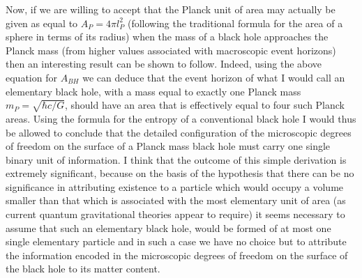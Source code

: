 \documentclass[notitlepage,12pt]{report}
\begin{document}
Now, if we are willing to accept that the Planck unit of area may actually be given as equal to $A_P=4\pi l_P^2$ (following the traditional formula for the area of a sphere in terms of its radius) when the mass of a black hole approaches the Planck mass (from higher values associated with macroscopic event horizons) then an interesting result can be shown to follow. Indeed, using the above equation for $A_{BH}$ we can deduce that the event horizon of what I would call an elementary black hole, with a mass equal to exactly one Planck mass $m_P=\sqrt{\hbar c/G}$, should have an area that is effectively equal to four such Planck areas. Using the formula for the entropy of a conventional black hole I would thus be allowed to conclude that the detailed configuration of the microscopic degrees of freedom on the surface of a Planck mass black hole must carry one single binary unit of information. I think that the outcome of this simple derivation is extremely significant, because on the basis of the hypothesis that there can be no significance in attributing existence to a particle which would occupy a volume smaller than that which is associated with the most elementary unit of area (as current quantum gravitational theories appear to require) it seems necessary to assume that such an elementary black hole, would be formed of at most one single elementary particle and in such a case we have no choice but to attribute the information encoded in the microscopic degrees of freedom on the surface of the black hole to its matter content.
\end{document}
